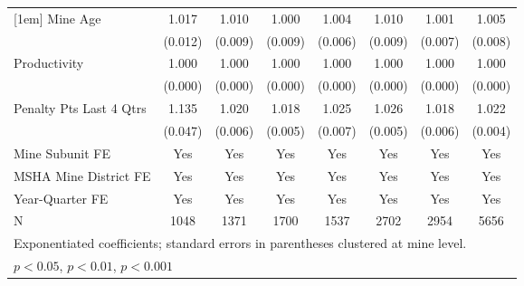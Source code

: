 {\begin{tabular}{l*{7}{c}}
[1em]
Mine Age                 &       1.017         &       1.010         &       1.000         &       1.004         &       1.010         &       1.001         &       1.005         \\
                         &     (0.012)         &     (0.009)         &     (0.009)         &     (0.006)         &     (0.009)         &     (0.007)         &     (0.008)         \\
[1em]
Productivity             &       1.000         &       1.000         &       1.000         &       1.000         &       1.000         &       1.000         &       1.000         \\
                         &     (0.000)         &     (0.000)         &     (0.000)         &     (0.000)         &     (0.000)         &     (0.000)         &     (0.000)         \\
[1em]
Penalty Pts Last 4 Qtrs  &       1.135\sym{**} &       1.020\sym{**} &       1.018\sym{***}&       1.025\sym{***}&       1.026\sym{***}&       1.018\sym{***}&       1.022\sym{***}\\
                         &     (0.047)         &     (0.006)         &     (0.005)         &     (0.007)         &     (0.005)         &     (0.006)         &     (0.004)         \\
[1em]
Mine Subunit FE          &         Yes         &         Yes         &         Yes         &         Yes         &         Yes         &         Yes         &         Yes         \\
[1em]
MSHA Mine District FE    &         Yes         &         Yes         &         Yes         &         Yes         &         Yes         &         Yes         &         Yes         \\
[1em]
Year-Quarter FE          &         Yes         &         Yes         &         Yes         &         Yes         &         Yes         &         Yes         &         Yes         \\
\hline
N                        &        1048         &        1371         &        1700         &        1537         &        2702         &        2954         &        5656         \\
\hline\hline
\multicolumn{8}{l}{\footnotesize Exponentiated coefficients; standard errors in parentheses clustered at mine level.}\\
\multicolumn{8}{l}{\footnotesize \sym{*} \(p<0.05\), \sym{**} \(p<0.01\), \sym{***} \(p<0.001\)}\\
\end{tabular}
}
